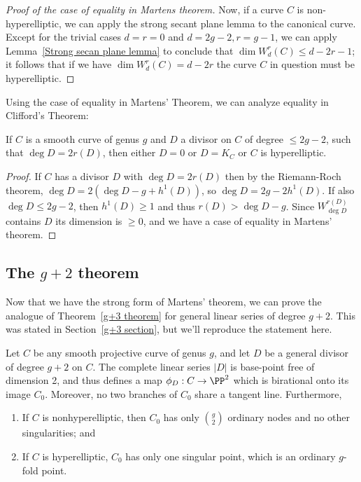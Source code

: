 \begin{proof}[Proof of the case of equality in Martens theorem]
 Now, if a curve $C$ is non-hyperelliptic, we can apply the strong secant plane lemma to the canonical curve. Except for the trivial cases $d=r=0$ and $d=2g-2, r=g-1$,
 we can apply Lemma~\ref{Strong secan plane lemma} to conclude that $\dim W^r_d(C) \leq d-2r-1$; it follows that if we have $\dim W^r_d(C) = d-2r$ the curve $C$ in question must be hyperelliptic.
\end{proof}

Using the case of equality in Martens' Theorem, we can analyze equality in 
Clifford's Theorem:

\begin{corollary}\label{equality in Clifford from Martens}
If $C$ is a smooth curve of genus $g$ and $D$ a divisor on $C$ of degree $\leq 2g-2$,
such that $\deg D = 2r(D)$, then either $D =0$ or $D=K_C$ or $C$ is hyperelliptic.
\end{corollary}

\begin{proof}
If $C$ has a divisor $D$ with $\deg D =2 r(D)$ then by the Riemann-Roch theorem,  $\deg D  = 2(\deg D-g+h^1(D))$, 
so $\deg D = 2g-2h^1(D)$. If also $\deg D\leq 2g-2$, then $h^1(D) \geq 1$
and thus $r(D) >\deg D-g$. Since $W^{r(D)}_{\deg D}$ contains $D$ its dimension
is $\geq 0$, and we have a case of equality in Martens' theorem.
\end{proof}


\subsection{The $g+2$ theorem}\label{g+2 section}

Now that we have the strong form of Martens' theorem, we can prove the analogue of Theorem~\ref{g+3 theorem} for general linear series of degree $g+2$. This was stated in Section~\ref{g+3 section}, but we'll reproduce the statement here.

\begin{theorem}
Let $C$ be any smooth projective curve of genus $g$, and let $D$ be a general divisor of degree $g+2$ on $C$. 
The complete linear series $|D|$ is base-point free of dimension 2, and thus defines a map $\phi_D: C\to \PP^2$
which is birational onto its image $C_0$. Moreover, no two branches of $C_0$ share a tangent line. Furthermore,

\begin{enumerate}
\item If $C$ is nonhyperelliptic, then $C_0$ has only $\binom{g}{2}$ ordinary nodes and no other singularities; and
\item If $C$ is hyperelliptic,  $C_0$ has only one singular point, which is an ordinary $g$-fold point.\end{enumerate}
\end{theorem}

